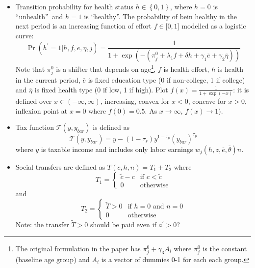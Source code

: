 \documentclass[12pt,a4paper]{article}
\begin{document}
\begin{itemize}
\item Transition probability for health status $h\in \left\{ 0,1\right\} $,
where $h=0$ is \textquotedblleft unhealth\textquotedblright\ and $h=1$ is
\textquotedblleft healthy\textquotedblright . The probability of bein
healthy in the next period is an increasing function of effort $f\in \lbrack
0,1]$ modelled as a logistic curve:%
\begin{equation*}
\Pr \left( h^{\prime }=1|h,f,\overline{e},\overline{\eta },j\right) =\frac{1%
}{1+\exp \left( -\left( \pi _{j}^{0}+\lambda _{1}f+\delta h+\gamma _{1}%
\overline{e}+\gamma _{2}\overline{\eta }\right) \right) }
\end{equation*}%
Note that $\pi _{j}^{0}$ is a shifter that depends on age\footnote{%
The original formulation in the paper has $\pi _{j}^{0}+\gamma _{3}A_{i}$
where $\pi _{j}^{0}$ is the constant (baseline age group) and $A_{i}$ is a
vector of dummies 0-1 for each each group.}, $f$ is health effort, $h$ is
health in the current period, $\overline{e}$ is fixed education type (0 if
non-college, 1 if college) and $\overline{\eta }$ is fixed health type (0 if
low, 1 if high). Plot $f(x)=\frac{1}{1+\exp (-x)}$: it is defined over $x\in
\left( -\infty ,\infty \right) $, increasing, convex for $x<0$, concave for $%
x>0$, inflexion point at $x=0$ where $f(0)=0.5$. As $x\rightarrow \infty $, $%
f(x)\rightarrow 1$).

\item Tax function $\mathcal{T}\left( y,y_{bar}\right) $ is defined as%
\begin{equation*}
\mathcal{T}\left( y,y_{bar}\right) =y-(1-\tau _{s})y^{1-\tau
_{p}}(y_{bar})^{\tau _{p}}
\end{equation*}%
where $y$ is taxable income and includes only labor earnings $w_{j}\left(
h,z,\overline{e},\overline{\theta }\right) n$.

\item Social transfers are defined as $T(c,h,n)=T_{1}+T_{2}$ where%
\begin{equation*}
T_{1}=\left\{ 
\begin{array}{ll}
\widetilde{c}-c & \text{if }c<\widetilde{c} \\ 
0 & \text{otherwise}%
\end{array}%
\right. 
\end{equation*}%
and%
\begin{equation*}
T_{2}=\left\{ 
\begin{array}{ll}
\widetilde{T}>0 & \text{if }h=0\text{ and }n=0 \\ 
0 & \text{otherwise}%
\end{array}%
\right. 
\end{equation*}%
Note: the transfer $\widetilde{T}>0$ should be paid even if $a^{\prime }>0$?


\end{itemize}
\end{document}
